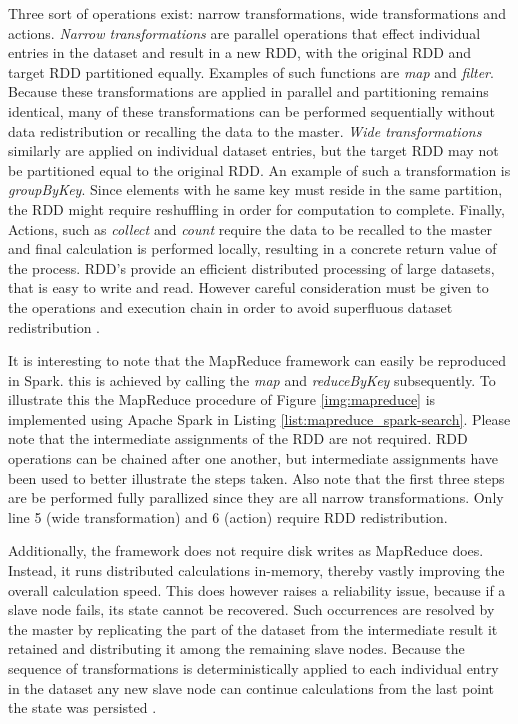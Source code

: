Three sort of operations exist: narrow transformations, wide transformations and actions. \emph{Narrow transformations} are parallel operations that effect individual entries in the dataset and result in a new RDD, with the original RDD and target RDD partitioned equally. Examples of such functions are \emph{map} and \emph{filter}. Because these transformations are applied in parallel and partitioning remains identical, many of these transformations can be performed sequentially without data redistribution or recalling the data to the master. \emph{Wide transformations} similarly are applied on individual dataset entries, but the target RDD may not be partitioned equal to the original RDD. An example of such a transformation is \emph{groupByKey}. Since elements with  he same key must reside in the same partition, the RDD might require reshuffling in order for computation to complete. Finally, Actions, such as \emph{collect} and \emph{count} require the data to be recalled to the master and final calculation is performed locally, resulting in a concrete return value of the process. RDD's provide an efficient distributed processing of large datasets, that is easy to write and read. However careful consideration must be given to the operations and execution chain in order to avoid superfluous dataset redistribution \cite{spark_programming_guide}.



It is interesting to note that the MapReduce framework can easily be reproduced in Spark. this is achieved by calling the \emph{map} and \emph{reduceByKey} subsequently. To illustrate this the MapReduce procedure of Figure \ref{img:mapreduce} is implemented using Apache Spark in Listing \ref{list:mapreduce_spark-search}. Please note that the intermediate assignments of the RDD are not required. RDD operations can be chained after one another, but intermediate assignments have been used to better illustrate the steps taken. Also note that the first three steps are be performed fully parallized since they are all narrow transformations. Only line 5 (wide transformation) and 6 (action) require RDD redistribution.

Additionally, the framework does not require disk writes as MapReduce does. Instead, it runs distributed calculations in-memory, thereby vastly improving the overall calculation speed. This does however raises a reliability issue, because if a slave node fails, its state cannot be recovered. Such occurrences are resolved by the master by replicating the part of the dataset from the intermediate result it retained and distributing it among the remaining slave nodes. Because the sequence of transformations is deterministically applied to each individual entry in the dataset any new slave node can continue calculations from the last point the state was persisted \cite{rdd_fault_tolerance}.

